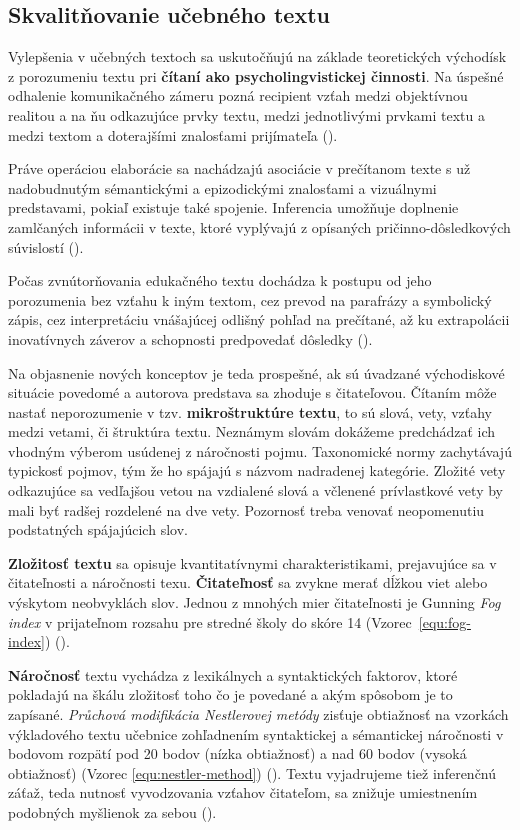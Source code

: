 \subsection{Skvalitňovanie učebného textu}
Vylepšenia v učebných textoch sa uskutočňujú na základe teoretických východísk z porozumeniu textu pri \textbf{čítaní ako psycholingvistickej činnosti}. Na úspešné odhalenie komunikačného zámeru pozná recipient vzťah medzi objektívnou realitou a na ňu odkazujúce prvky textu, medzi jednotlivými prvkami textu a medzi textom a doterajšími znalosťami prijímateľa (\cite{gavora_ziak_1992}). 

Práve operáciou elaborácie sa nachádzajú asociácie v prečítanom texte s už nadobudnutým sémantickými a epizodickými znalosťami a vizuálnymi predstavami, pokiaľ existuje také spojenie. Inferencia umožňuje doplnenie zamlčaných informácii v texte, ktoré vyplývajú z opísaných pričinno-dôsledkových súvislostí (\cite{gavora_ziak_1992}).

Počas zvnútorňovania edukačného textu dochádza k postupu od jeho porozumenia bez vzťahu k iným textom, cez prevod na parafrázy a symbolický zápis, cez interpretáciu vnášajúcej odlišný pohľad na prečítané, až ku extrapolácii inovatívnych záverov a schopnosti predpovedať dôsledky (\cite{gavora_ziak_1992}). 

Na objasnenie nových konceptov je teda prospešné, ak sú úvadzané východiskové situácie povedomé a autorova predstava sa zhoduje s čitateľovou. Čítaním môže nastať neporozumenie v tzv. \textbf{mikroštruktúre textu}, to sú slová, vety, vzťahy medzi vetami, či štruktúra textu. Neznámym slovám dokážeme predchádzať ich vhodným výberom usúdenej z náročnosti pojmu. Taxonomické normy zachytávajú typickosť pojmov, tým že ho spájajú s názvom nadradenej kategórie. Zložité vety odkazujúce sa vedľajšou vetou na vzdialené slová a včlenené prívlastkové vety by mali byť radšej rozdelené na dve vety. Pozornosť treba venovať neopomenutiu podstatných spájajúcich slov. 

\textbf{Zložitosť textu} sa opisuje kvantitatívnymi charakteristikami, prejavujúce sa v čitateľnosti a náročnosti texu. \textbf{Čitateľnosť} sa zvykne merať dĺžkou viet alebo výskytom neobvyklách slov. Jednou z mnohých mier čitateľnosti je Gunning \emph{Fog index} v prijateľnom rozsahu pre stredné školy do skóre 14 (Vzorec~\ref{equ:fog-index}) (\cite{drahosova_hodnotenie_2014}). 

\textbf{Náročnosť} textu vychádza z lexikálnych a syntaktických faktorov, ktoré pokladajú na škálu zložitosť toho čo je povedané a akým spôsobom je to zapísané. \emph{Průchová modifikácia Nestlerovej metódy} zisťuje obtiažnosť na vzorkách výkladového textu učebnice zohľadnením syntaktickej a sémantickej náročnosti  v bodovom rozpätí pod 20 bodov (nízka obtiažnosť) a nad 60 bodov (vysoká obtiažnosť) (Vzorec \ref{equ:nestler-method}) (\cite{drahosova_hodnotenie_2014}). Textu vyjadrujeme tiež inferenčnú záťaž, teda nutnosť vyvodzovania vzťahov čitateľom, sa znižuje umiestnením podobných myšlienok za sebou (\cite{pavlovkin_ziak_1989}).

